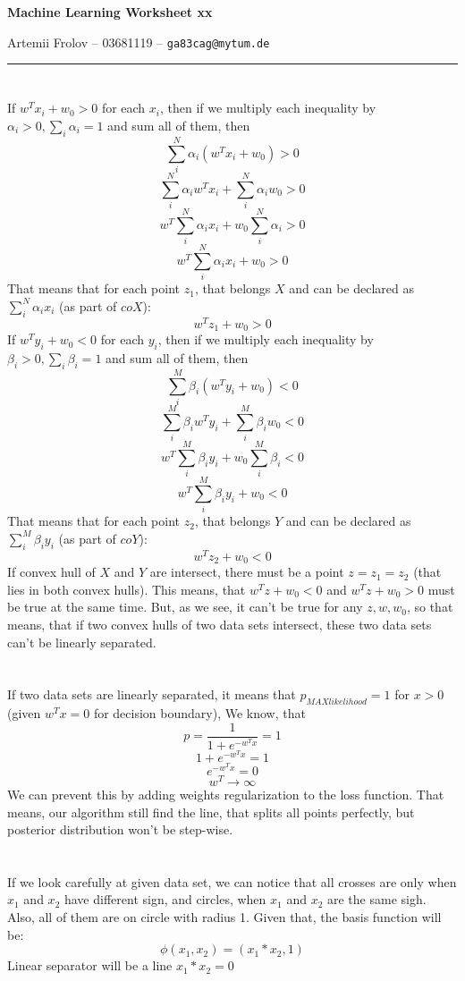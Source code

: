 \documentclass[11pt]{article}
\makeatletter
\newcommand{\exercise}{\section{}}
\newcommand{\hwhead}[4]{
\begin{center}
\sffamily\large\bfseries Machine Learning Worksheet #1
\vspace{2mm} 
\normalfont

#2 -- #3 -- \texttt{#4}
\end{center}
\vspace{6mm} \hrule \vspace{4mm}
}
\newcommand{\name}{Artemii Frolov} %
\newcommand{\imat}{03681119} %
\newcommand{\email}{ga83cag@mytum.de} %
\makeatother
\begin{document}
\hwhead{xx}{\name}{\imat}{\email}


\exercise %
If $w^Tx_i+w_0>0$ for each $x_i$, then if we multiply each inequality by $\alpha_i>0, \sum_i \alpha_i=1 $ and sum all of them, then 
$$\sum_i^N \alpha_i (w^Tx_i+w_0)>0$$
$$\sum_i^N \alpha_i w^Tx_i+\sum_i^N \alpha_i w_0>0$$
$$w^T\sum_i^N \alpha_i x_i+  w_0 \sum_i^N \alpha_i>0$$
$$w^T\sum_i^N \alpha_i x_i+  w_0 >0$$
That means that for each point $z_1$, that belongs $X$ and can be declared as $\sum_i^N \alpha_i x_i$ (as part of $coX$):
$$w^Tz_1 +  w_0 >0$$
If $w^Ty_i+w_0<0$ for each $y_i$, then if we multiply each inequality by $\beta_i>0, \sum_i \beta_i=1 $  and sum all of them, then 
$$\sum_i^M \beta_i (w^Ty_i+w_0)<0$$
$$\sum_i^M \beta_i w^Ty_i+\sum_i^M \beta_i w_0<0$$
$$w^T\sum_i^M \beta_i y_i+  w_0 \sum_i^M \beta_i<0$$
$$w^T\sum_i^M \beta_i y_i+  w_0 <0$$
That means that for each point $z_2$, that belongs $Y$ and can be declared as $\sum_i^M \beta_i y_i$ (as part of $coY$):
$$w^Tz_2 +  w_0 <0$$
If convex hull of $X$ and $Y$ are intersect, there must be a point $z=z_1=z_2$ (that lies in both convex hulls). This means, that $w^Tz +  w_0 <0$ and $w^T z +  w_0 >0$ must be true at the same time. But, as we see, it can't be true for any $z, w, w_0$, so that means, that if two convex hulls of two data sets intersect, these two data sets can't be  linearly separated.
\exercise
If two data sets are linearly separated, it means that $p_{MAXlikelihood}=1$ for $x>0$ (given $w^Tx=0$ for decision boundary),  We know, that 
$$p=\frac{1}{1+e^{-w^Tx}}=1$$
$$1+e^{-w^Tx}=1$$
$$e^{-w^Tx}=0$$
$$w^T \rightarrow \infty$$
We can prevent this by adding weights regularization to the loss function. That means, our algorithm still find the line, that splits all points perfectly, but posterior distribution won't be step-wise.

\exercise
If we look carefully at given data set, we can notice that all crosses are only when $x_1$ and $x_2$ have different sign, and circles, when $x_1$ and $x_2$ are the same sigh. Also, all of them are on circle with radius 1. Given that, the basis function will be:
$$\phi(x_1,x_2) = (x_1*x_2, 1)$$
Linear separator will be a line $x_1*x_2=0$
\end{document}
